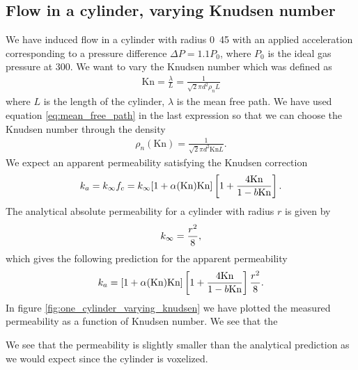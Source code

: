 \subsection{Flow in a cylinder, varying Knudsen number}
We have induced flow in a cylinder with radius \unit{0.45}{\micro\meter} with an applied acceleration corresponding to a pressure difference $\Delta P = 1.1P_0$, where $P_0$ is the ideal gas pressure at \unit{300}{\kelvin}. We want to vary the Knudsen number which was defined as
\begin{align}
	\text{Kn} = \frac{\lambda}{L} = \frac{1}{\sqrt 2 \pi d^2 \rho_n L}
\end{align}
where $L$ is the length of the cylinder, $\lambda$ is the mean free path. We have used equation \eqref{eq:mean_free_path} in the last expression so that we can choose the Knudsen number through the density
\begin{align}
	\rho_n(\text{Kn}) = \frac{1}{\sqrt 2 \pi d^2 \text{Kn}L}.
\end{align}
We expect an apparent permeability satisfying the Knudsen correction
\begin{align}
	k_a = k_\infty f_c = k_\infty[1 + \alpha(\text{Kn})\text{Kn}]\left[1 + {4\text{Kn}\over 1 - b\text{Kn}}\right].
\end{align}
The analytical absolute permeability for a cylinder with radius $r$ is given by\cite{karniadakis2005microflows}
\begin{align}
	\label{eq:permeability_cylinder}
	k_\infty = {r^2\over 8},
\end{align}
which gives the following prediction for the apparent permeability
\begin{align}
	k_a = [1 + \alpha(\text{Kn})\text{Kn}]\left[1 + {4\text{Kn}\over 1 - b\text{Kn}}\right] {r^2\over 8}.
\end{align}
In figure \ref{fig:one_cylinder_varying_knudsen} we have plotted the measured permeability as a function of Knudsen number. We see that the 

We see that the permeability is slightly smaller than the analytical prediction as we would expect since the cylinder is voxelized.

